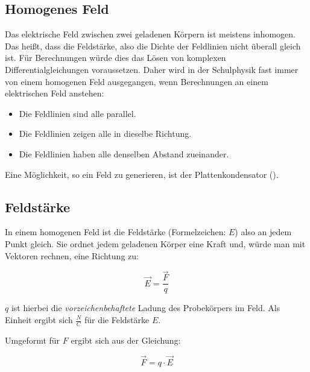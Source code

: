 \subsection{Homogenes Feld} \label{subsec:EFeldHomogen}

Das elektrische Feld zwischen zwei geladenen Körpern ist meistens inhomogen. Das heißt, dass die Feldstärke, also die Dichte der Feldlinien nicht überall gleich ist. Für Berechnungen würde dies das Lösen von komplexen Differentialgleichungen voraussetzen. Daher wird in der Schulphysik fast immer von einem homogenen Feld ausgegangen, wenn Berechnungen an einem elektrischen Feld anstehen:

\begin{itemize}
	\item Die Feldlinien sind alle parallel.
	\item Die Feldlinien zeigen alle in dieselbe Richtung.
	\item Die Feldlinien haben alle denselben Abstand zueinander.
\end{itemize} 

\noindent Eine Möglichkeit, so ein Feld zu generieren, ist der Plattenkondensator ().


\subsection{Feldstärke}  \label{subsec:Feldstaerke}

In einem homogenen Feld ist die Feldstärke (Formelzeichen: $E$) also an jedem Punkt gleich. Sie ordnet jedem geladenen Körper eine Kraft und, würde man mit Vektoren rechnen, eine Richtung zu:

\begin{equation} \label{eq:feldstaerke}
	\vec{E} = \frac{\vec{F}}{q}
\end{equation}

\noindent $q$ ist hierbei die \emph{vorzeichenbehaftete} Ladung des Probekörpers im Feld. Als Einheit ergibt sich $\frac{N}{C}$ für die Feldstärke $E$. 

Umgeformt für $F$ ergibt sich aus der Gleichung:

\begin{equation} \label{eq:feldstaerke_nach_F}
	\vec{F} = q \cdot \vec{E}
\end{equation}








